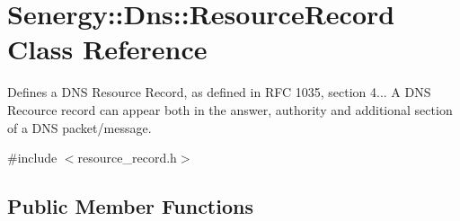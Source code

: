 \hypertarget{class_senergy_1_1_dns_1_1_resource_record}{\section{Senergy\-:\-:Dns\-:\-:Resource\-Record Class Reference}
\label{class_senergy_1_1_dns_1_1_resource_record}
}


Defines a D\-N\-S Resource Record, as defined in R\-F\-C 1035, section 4... A D\-N\-S Recource record can appear both in the answer, authority and additional section of a D\-N\-S packet/message.  




{\ttfamily \#include $<$resource\-\_\-record.\-h$>$}

\subsection*{Public Member Functions}
